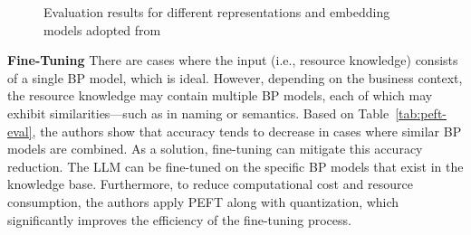\documentclass[%
    paper=A4,                    %
    twoside=true,               %
    openright,                  %
    parskip=full,               %
    chapterprefix=true,         %
    11pt,                       %
    headings=normal,            %
    bibliography=totoc,         %
    listof=totoc,              %
    titlepage=on,              %
    captions=tableabove,        %
    draft=false,               %
]{scrreprt}%
\begin{document}
\begin{figure}[H]
	\centering
	
	\caption{Evaluation results for different representations and embedding models adopted from \cite{bernardi2024conversing}}
	\label{embedding_chart}
\end{figure}
\textbf{Fine-Tuning}\hspace{0.5em}
There are cases where the input (i.e., resource knowledge) consists of a single BP model, which is ideal. However, depending on the business context, the resource knowledge may contain multiple BP models, each of which may exhibit similarities—such as in naming or semantics. Based on Table~\ref{tab:peft-eval}, the authors \cite{bernardi2024conversing} show that accuracy tends to decrease in cases where similar BP models are combined.
As a solution, fine-tuning can mitigate this accuracy reduction. The LLM can be fine-tuned on the specific BP models that exist in the knowledge base. Furthermore, to reduce computational cost and resource consumption, the authors apply PEFT along with quantization, which significantly improves the efficiency of the fine-tuning process.
\end{document}
